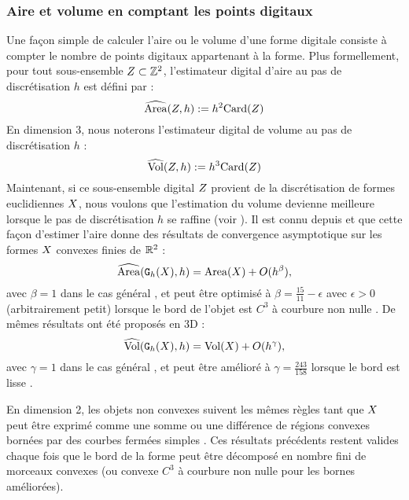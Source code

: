 \subsubsection{Aire et volume en comptant les points digitaux}
\label{sec:AreaByCounting}
Une façon simple de calculer l'aire ou le volume d'une forme digitale consiste à
compter le nombre de points digitaux appartenant à la forme. Plus formellement,
pour tout sous-ensemble $Z \subset \mathbb{Z}^2$, l'estimateur digital d'aire au pas
de discrétisation $h$ est défini par :
%
\begin{equation}
  \widehat{\mathrm{Area}}(Z, h) := h^2 \mathrm{Card}(Z)
\end{equation}
%
En dimension $3$, nous noterons l'estimateur digital de volume au pas de
discrétisation $h$ :
%
\begin{equation}
  \widehat{\mathrm{Vol}}(Z, h) := h^3 \mathrm{Card}(Z)
\end{equation}
%
Maintenant, si ce sous-ensemble digital $Z$ provient de la discrétisation de
formes euclidiennes $X$, nous voulons que l'estimation du volume devienne
meilleure lorsque le pas de discrétisation $h$ se raffine (voir
). Il est connu depuis
 et  que cette façon d'estimer l'aire donne
des résultats de convergence asymptotique sur les formes $X$ convexes
finies de $\mathbb{R}^2$ :
%
\begin{equation}
  \label{eq:AreaByCountingConv}
  \widehat{\mathrm{Area}}(\mathtt{G}_{h}(X),h) = \mathrm{Area}(X) + O(h^\beta),
\end{equation}
%
avec $\beta = 1$ dans le cas général \cite{Klette2000}, et peut être optimisé à
$\beta = \frac{15}{11} - \epsilon$ avec $\epsilon > 0$ (arbitrairement petit)
lorsque le bord de l'objet est $C^3$ à courbure non nulle \cite{Huxley1990}.
De mêmes résultats ont été proposés en 3D :
%
\begin{equation}
  \label{eq:VolumeByCountingConv}
  \widehat{\mathrm{Vol}}(\mathtt{G}_{h}(X),h) = \mathrm{Vol}(X) + O(h^\gamma),
\end{equation}
%
avec $\gamma = 1$ dans le cas général \cite{Kratzel1988}, et peut être amélioré à
$\gamma=\frac{243}{158}$ lorsque le bord est lisse \cite{Guo2010}.

En dimension 2, les objets non convexes suivent les mêmes règles tant que
$X$ peut être exprimé comme une somme ou une différence de régions convexes
bornées par des courbes fermées simples \cite{Huxley1996}. Ces résultats
précédents restent valides chaque fois que le bord de la forme peut être
décomposé en nombre fini de morceaux convexes (ou convexe $C^3$ à courbure non
nulle pour les bornes améliorées).

